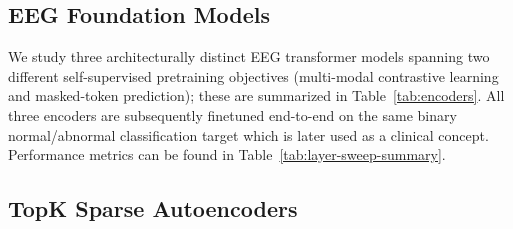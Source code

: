 \documentclass{article}
\begin{document}
\subsection{EEG Foundation Models}
\label{sec:eeg_models}

We study three architecturally distinct EEG transformer models spanning two different self-supervised pretraining objectives (multi-modal contrastive learning and masked-token prediction); these are summarized in Table~\ref{tab:encoders}. All three encoders are subsequently finetuned end-to-end on the same binary normal/abnormal classification target which is later used as a clinical concept. Performance metrics can be found in Table~\ref{tab:layer-sweep-summary}.

\begin{table}[h]
  \caption{\textbf{Encoder overview.} Three architecturally distinct EEG transformers spanning different SSL objectives: multi-modal contrastive learning (SleepFM), masked-token reconstruction (REVE), and masked spectrum prediction (LaBraM) are inspected. SleepFM is pretrained on PSG data (EEG, ECG, EMG, and respiratory) with a multi-modal contrastive objective, while REVE and LaBraM are pretrained on EEG alone. All three are subsequently finetuned end-to-end on the same binary normal/abnormal target.}
  \label{tab:encoders}
  \centering
  \small
\end{table}

\subsection{TopK Sparse Autoencoders}
\label{sec:background_sae}
\end{document}
